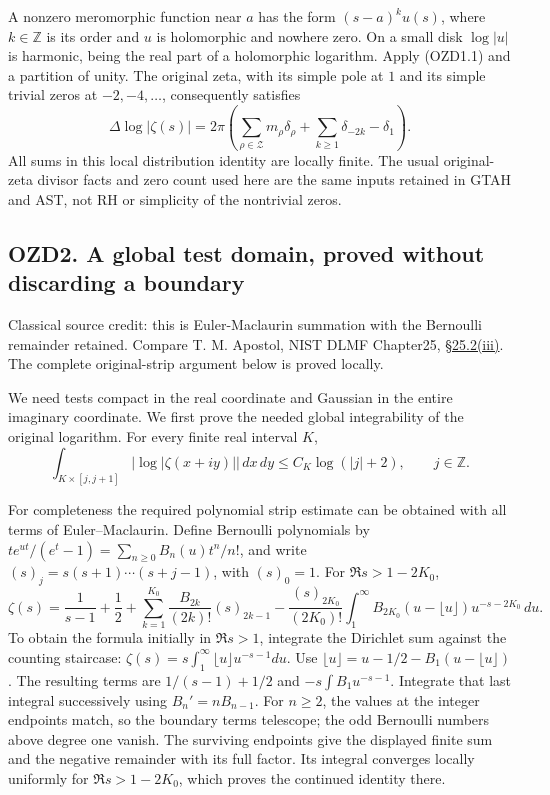 A nonzero meromorphic function near \(a\) has the form \((s-a)^k u(s)\),
where \(k\in\mathbb Z\) is its order and \(u\) is holomorphic and
nowhere zero. On a small disk \(\log|u|\) is harmonic, being the real
part of a holomorphic logarithm. Apply (OZD1.1) and a partition of
unity. The original zeta, with its simple pole at \(1\) and its simple
trivial zeros at \(-2,-4,\ldots\), consequently satisfies \[
\boxed{\Delta\log|\zeta(s)|
=2\pi\left(\sum_{\rho\in\mathscr Z}m_\rho\delta_\rho
+\sum_{k\ge1}\delta_{-2k}-\delta_1\right).}
\tag{OZD1.2}
\] All sums in this local distribution identity are locally finite. The
usual original-zeta divisor facts and zero count used here are the same
inputs retained in GTAH and AST, not RH or simplicity of the nontrivial
zeros.

\subsection{OZD2. A global test domain, proved without discarding a
boundary}\label{ozd2.-a-global-test-domain-proved-without-discarding-a-boundary}

Classical source credit: this is Euler-Maclaurin summation with the
Bernoulli remainder retained. Compare T. M. Apostol, NIST DLMF
Chapter25, \href{https://dlmf.nist.gov/25.2\#iii}{§25.2(iii)}. The
complete original-strip argument below is proved locally.

We need tests compact in the real coordinate and Gaussian in the entire
imaginary coordinate. We first prove the needed global integrability of
the original logarithm. For every finite real interval \(K\), \[
\int_{K\times[j,j+1]}|\log|\zeta(x+iy)||\,dx\,dy
\le C_K\log(|j|+2),\qquad j\in\mathbb Z.
\tag{OZD2.1}
\]

For completeness the required polynomial strip estimate can be obtained
with all terms of Euler--Maclaurin. Define Bernoulli polynomials by
\(te^{ut}/(e^t-1)=\sum_{n\ge0}B_n(u)t^n/n!\), and write
\((s)_j=s(s+1)\cdots(s+j-1)\), with \((s)_0=1\). For \(\Re s>1-2K_0\),
\[
\zeta(s)=\frac1{s-1}+\frac12
+\sum_{k=1}^{K_0}\frac{B_{2k}}{(2k)!}(s)_{2k-1}
-\frac{(s)_{2K_0}}{(2K_0)!}
\int_1^\infty B_{2K_0}(u-\lfloor u\rfloor)u^{-s-2K_0}\,du.
\tag{OZD2.2}
\] To obtain the formula initially in \(\Re s>1\), integrate the
Dirichlet sum against the counting staircase:
\(\zeta(s)=s\int_1^\infty\lfloor u\rfloor u^{-s-1}du\). Use
\(\lfloor u\rfloor=u-1/2-B_1(u-\lfloor u\rfloor)\). The resulting terms
are \(1/(s-1)+1/2\) and \(-s\int B_1u^{-s-1}\). Integrate that last
integral successively using \(B_n'=nB_{n-1}\). For \(n\ge2\), the values
at the integer endpoints match, so the boundary terms telescope; the odd
Bernoulli numbers above degree one vanish. The surviving endpoints give
the displayed finite sum and the negative remainder with its full
factor. Its integral converges locally uniformly for \(\Re s>1-2K_0\),
which proves the continued identity there.

